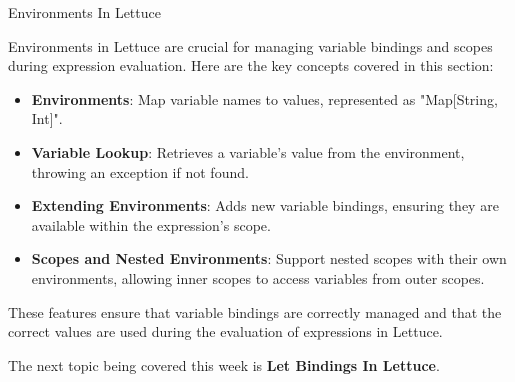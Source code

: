 \begin{notes}{Environments In Lettuce}
\begin{highlight}
    \end{highlight}
    
    \begin{highlight}
    
        Environments in Lettuce are crucial for managing variable bindings and scopes during expression evaluation. Here are the key concepts covered in this section:
    
        \begin{itemize}
            \item \textbf{Environments}: Map variable names to values, represented as "Map[String, Int]".
            \item \textbf{Variable Lookup}: Retrieves a variable's value from the environment, throwing an exception if not found.
            \item \textbf{Extending Environments}: Adds new variable bindings, ensuring they are available within the expression's scope.
            \item \textbf{Scopes and Nested Environments}: Support nested scopes with their own environments, allowing inner scopes to access variables from outer scopes.
        \end{itemize}
        
        These features ensure that variable bindings are correctly managed and that the correct values are used during the evaluation of expressions in Lettuce.
    
    \end{highlight}
\end{notes}

The next topic being covered this week is \textbf{Let Bindings In Lettuce}.

